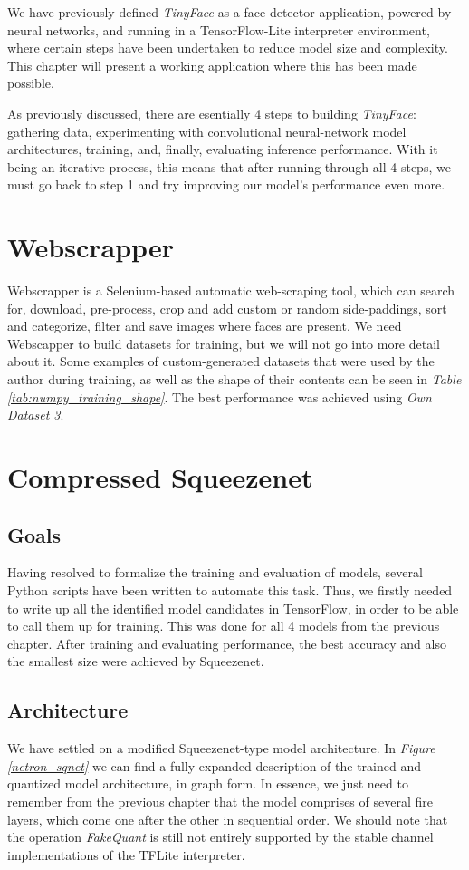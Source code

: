 We have previously defined \textit{TinyFace} as a face detector application, powered by neural networks, and running in a TensorFlow-Lite interpreter environment, where certain steps have been undertaken to reduce model size and complexity. This chapter will present a working application where this has been made possible. \par
As previously discussed, there are esentially 4 steps to building \textit{TinyFace}: gathering data, experimenting with convolutional neural-network model architectures, training, and, finally, evaluating inference performance. With it being an iterative process, this means that after running through all 4 steps, we must go back to step 1 and try improving our model's performance even more. \par
\section{Webscrapper}

Webscrapper is a Selenium-based automatic web-scraping tool, which can search for, download, pre-process, crop and add custom or random side-paddings, sort and categorize, filter and save images where faces are present. We need Webscapper to build datasets for training, but we will not go into more detail about it. Some examples of custom-generated datasets that were used by the author during training, as well as the shape of their contents can be seen in \textit{Table \ref{tab:numpy_training_shape}}. The best performance was achieved using \textit{Own Dataset 3}.
\section{Compressed Squeezenet}
\subsection{Goals}
Having resolved to formalize the training and evaluation of models, several Python scripts have been written to automate this task. Thus, we firstly needed to write up all the identified model candidates in TensorFlow, in order to be able to call them up for training. This was done for all 4 models from the previous chapter. After training and evaluating performance, the best accuracy and also the smallest size were achieved by Squeezenet.
\subsection{Architecture}
We have settled on a modified Squeezenet-type model architecture. In \textit{Figure \ref{netron_sqnet}} we can find a fully expanded description of the trained and quantized model architecture, in graph form. In essence, we just need to remember from the previous chapter that the model comprises of several fire layers, which come one after the other in sequential order. We should note that the operation \textit{FakeQuant} is still not entirely supported by the stable channel implementations of the TFLite interpreter.

